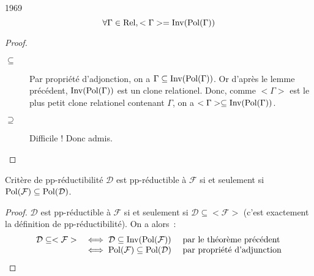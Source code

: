 \begin{theo}{1969}
    \[\forall \Gamma\in\text{Rel}, <\Gamma> = \text{Inv}(\text{Pol}(\Gamma))\]
\end{theo}
\begin{proof}\begin{description}
    \item[$\subseteq$] Par propriété d'adjonction, on a 
        $\Gamma\subseteq\text{Inv}(\text{Pol}(\Gamma))$. Or d'après le lemme précédent, 
        $\text{Inv}(\text{Pol}(\Gamma))$ est un clone relationel. Donc, comme $<\Gamma >$ est le
        plus petit clone relationel contenant $\Gamma$, on a 
        $<\Gamma>\subseteq\text{Inv}(\text{Pol}(\Gamma))$.
    \item[$\supseteq$] Difficile ! Donc admis. %
\end{description}\end{proof}

\begin{cor}{Critère de pp-réductibilité}
    $\mathcal{D}$ est pp-réductible à $\mathcal{F}$ si et seulement si
    $\text{Pol}(\mathcal{F})\subseteq\text{Pol}(\mathcal{D})$.
\end{cor}

\begin{proof}
    $\mathcal{D}$ est pp-réductible à $\mathcal{F}$ si et seulement si
    $\mathcal{D}\subseteq<\mathcal{F}>$ (c'est exactement la définition de
    pp-réductibilité). On a alors~:
    \[\begin{array}{rll}
        \mathcal{D}\subseteq<\mathcal{F}>
          &\iff \mathcal{D}\subseteq\text{Inv}(\text{Pol}(\mathcal{F}))
            & \text{ par le théorème précédent} \\
          &\iff \text{Pol}(\mathcal{F})\subseteq\text{Pol}(\mathcal{D})
            & \text{ par propriété d'adjunction} \\
    \end{array}\]
\end{proof}



